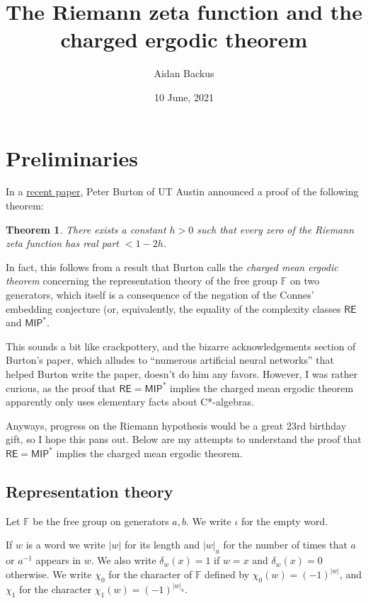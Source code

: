 \documentclass[reqno,12pt,letterpaper]{amsart}
\author{Aidan Backus}
\date{10 June, 2021}
\title{The Riemann zeta function and the charged ergodic theorem}
\newtheorem{theorem}{Theorem}[section]
\theoremstyle{definition}
\newcommand{\F}{\mathbb F}
\begin{document}
\maketitle
\tableofcontents


\section{Preliminaries}
\label{sec:org120d474}
In a \href{https://arxiv.org/pdf/2106.04644.pdf}{recent paper}, Peter Burton of UT Austin announced a proof of the following theorem:

\begin{theorem}
There exists a constant \(h > 0\) such that every zero of the Riemann zeta function has real part \(< 1 - 2h\).
\end{theorem}

In fact, this follows from a result that Burton calls the \emph{charged mean ergodic theorem} concerning the representation theory of the free group \(\F\) on two generators, which itself is a consequence of the negation of the Connes' embedding conjecture (or, equivalently, the equality of the complexity classes \(\mathsf{RE}\) and \(\mathsf{MIP^*}\).

This sounds a bit like crackpottery, and the bizarre acknowledgements section of Burton's paper, which alludes to ``numerous artificial neural networks'' that helped Burton write the paper, doesn't do him any favors. However, I was rather curious, as the proof that \(\mathsf{RE} = \mathsf{MIP^*}\) implies the charged mean ergodic theorem apparently only uses elementary facts about C*-algebras.

Anyways, progress on the Riemann hypothesis would be a great 23rd birthday gift, so I hope this pans out. Below are my attempts to understand the proof that \(\mathsf{RE} = \mathsf{MIP^*}\) implies the charged mean ergodic theorem.

\subsection{Representation theory}
\label{sec:org6823e3f}

Let \(\F\) be the free group on generators \(a,b\).
We write \(\iota\) for the empty word.

If \(w\) is a word we write \(|w|\) for its length and \(|w|_a\) for the number of times that \(a\) or \(a^{-1}\) appears in \(w\).
We also write \(\delta_w(x) = 1\) if \(w = x\) and \(\delta_w(x) = 0\) otherwise.
We write \(\chi_0\) for the character of \(\mathbb F\) defined by \(\chi_0(w) = (-1)^{|w|}\), and \(\chi_1\) for the character \(\chi_1(w) = (-1)^{|w|_a}\).
\end{document}
